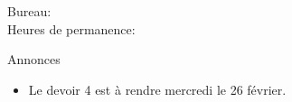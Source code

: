 \documentclass{beamer}
\subtitle[Pluriel et place des adjectifs]{Le pluriel et la place des adjectifs qualificatifs}
\begin{document}
  \begin{frame}
    \titlepage
    \tiny{Bureau: \\
          Heures de permanence: }
  \end{frame}

  \begin{frame}{Annonces}
    \begin{itemize}
      \item Le devoir 4 est à rendre mercredi le 26 février.
    \end{itemize}
  \end{frame}

\end{document}

